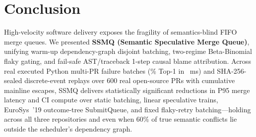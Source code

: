 \section{Conclusion}
\label{sec:conclusion}

High-velocity software delivery exposes the fragility of semantics-blind FIFO merge queues. We presented \textbf{SSMQ (Semantic Speculative Merge Queue)}, unifying warm-up dependency-graph disjoint batching, two-regime Beta-Binomial flaky gating, and fail-safe AST/traceback 1-step causal blame attribution. Across \BenchTotalBatches{} real executed Python multi-PR failure batches (\BenchASTTopOnePct{}\% Top-1 in \BenchASTMs{}~ms) and \TotalSealedRecords{} SHA-256-sealed discrete-event replays over 600 real open-source PRs with \TotalEscapedDefects{} cumulative mainline escapes, SSMQ delivers statistically significant reductions in P95 merge latency and CI compute over static batching, linear speculative trains, EuroSys~'19 outcome-tree SubmitQueue, and fixed flaky-retry batching---holding across all three repositories and even when $60\%$ of true semantic conflicts lie outside the scheduler's dependency graph.
